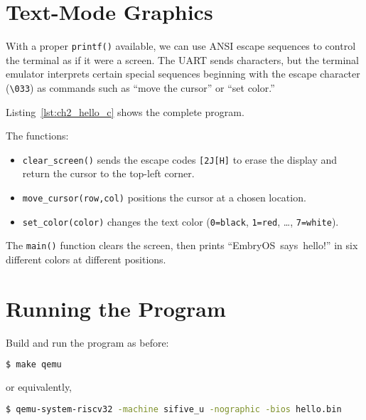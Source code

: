\section{Text-Mode Graphics}

With a proper \texttt{printf()} available, we can use ANSI escape sequences to
control the terminal as if it were a screen.  The UART sends characters, but
the terminal emulator interprets certain special sequences beginning with the
escape character (\texttt{\textbackslash033}) as commands such as ``move the
cursor'' or ``set color.''

Listing~\ref{lst:ch2_hello_c} shows the complete program.

\begin{figure}[H]
\centering
\begin{minipage}{0.9\textwidth}

\end{minipage}
\end{figure}

The functions:

\begin{itemize}
  \item \texttt{clear\_screen()} sends the escape codes
        \texttt{[2J[H]} to erase the display and return the cursor to the
        top-left corner.
  \item \texttt{move\_cursor(row,col)} positions the cursor at a chosen location.
  \item \texttt{set\_color(color)} changes the text color
        (\texttt{0=black}, \texttt{1=red}, …, \texttt{7=white}).
\end{itemize}

The \texttt{main()} function clears the screen, then prints
``EmbryOS~says~hello!'' in six different colors at different positions.

\section{Running the Program}

Build and run the program as before:

\begin{lstlisting}[style=oscode,language=bash]
$ make qemu
\end{lstlisting}

or equivalently,

\begin{lstlisting}[style=oscode,language=bash]
$ qemu-system-riscv32 -machine sifive_u -nographic -bios hello.bin
\end{lstlisting}

